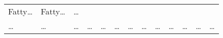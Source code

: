 \documentclass[
]{article}
\begin{document}
\begin{longtable}[]{@{}lllllllllllll@{}}
\begin{minipage}[t]{0.05\columnwidth}
Fatty\ldots{}\strut
\end{minipage} & \begin{minipage}[t]{0.05\columnwidth}\raggedright
Fatty\ldots{}\strut
\end{minipage} & \begin{minipage}[t]{0.02\columnwidth}\raggedright
\ldots{}\strut
\end{minipage}\tabularnewline
\begin{minipage}[t]{0.05\columnwidth}\raggedright
\ldots{}\strut
\end{minipage} & \begin{minipage}[t]{0.05\columnwidth}\raggedright
\ldots{}\strut
\end{minipage} & \begin{minipage}[t]{0.05\columnwidth}\raggedright
\ldots{}\strut
\end{minipage} & \begin{minipage}[t]{0.05\columnwidth}\raggedright
\ldots{}\strut
\end{minipage} & \begin{minipage}[t]{0.05\columnwidth}\raggedright
\ldots{}\strut
\end{minipage} & \begin{minipage}[t]{0.07\columnwidth}\raggedright
\ldots{}\strut
\end{minipage} & \begin{minipage}[t]{0.07\columnwidth}\raggedright
\ldots{}\strut
\end{minipage} & \begin{minipage}[t]{0.05\columnwidth}\raggedright
\ldots{}\strut
\end{minipage} & \begin{minipage}[t]{0.04\columnwidth}\raggedright
\ldots{}\strut
\end{minipage} & \begin{minipage}[t]{0.05\columnwidth}\raggedright
\ldots{}\strut
\end{minipage} & \begin{minipage}[t]{0.05\columnwidth}\raggedright
\ldots{}\strut
\end{minipage} & \begin{minipage}[t]{0.05\columnwidth}\raggedright
\ldots{}\strut
\end{minipage} & \begin{minipage}[t]{0.02\columnwidth}\raggedright
\ldots{}\strut
\end{minipage}\tabularnewline
\bottomrule
\end{longtable}
\end{document}
